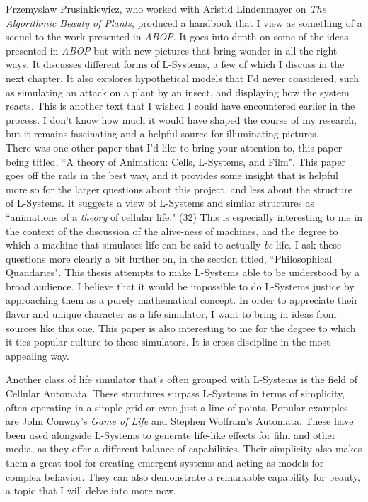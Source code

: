 \documentclass[12pt,twoside]{reedthesis}
\begin{document}
	Przemyslaw Prusinkiewicz, who worked with Aristid Lindenmayer on \textit{The Algorithmic Beauty of Plants}, produced a handbook that I view as something of a sequel to the work presented in \textit{ABOP}. It goes into depth on some of the ideas presented in \textit{ABOP} but with new pictures that bring wonder in all the right ways. It discusses different forms of L-Systems, a few of which I discuss in the next chapter. It also explores hypothetical models that I'd never considered, such as simulating an attack on a plant by an insect, and displaying how the system reacts. This is another text that I wished I could have encountered earlier in the process. I don't know how much it would have shaped the course of my research, but it remains fascinating and a helpful source for illuminating pictures.\\
	
	There was one other paper that I'd like to bring your attention to, this paper being titled, ``A theory of Animation: Cells, L-Systems, and Film". This paper goes off the rails in the best way, and it provides some insight that is helpful more so for the larger questions about this project, and less about the structure of L-Systems. It suggests a view of L-Systems and similar structures as ``animations of a \textit{theory} of cellular life." (32) This is especially interesting to me in the context of the discussion of the alive-ness of machines, and the degree to which a machine that simulates life can be said to actually \textit{be} life. I ask these questions more clearly a bit further on, in the section titled, ``Philosophical Quandaries". This thesis attempts to make L-Systems able to be understood by a broad audience. I believe that it would be impossible to do L-Systems justice by approaching them as a purely mathematical concept. In order to appreciate their flavor and unique character as a life simulator, I want to bring in ideas from sources like this one. This paper is also interesting to me for the degree to which it ties popular culture to these simulators. It is cross-discipline in the most appealing way.
	
	Another class of life simulator that's often grouped with L-Systems is the field of Cellular Automata. These structures surpass L-Systems in terms of simplicity, often operating in a simple grid or even just a line of points. Popular examples are John Conway's \textit{Game of Life} and Stephen Wolfram's Automata. These have been used alongside L-Systems to generate life-like effects for film and other media, as they offer a different balance of capabilities. Their simplicity also makes them a great tool for creating emergent systems and acting as models for complex behavior. They can also demonstrate a remarkable capability for beauty, a topic that I will delve into more now.
\end{document}
